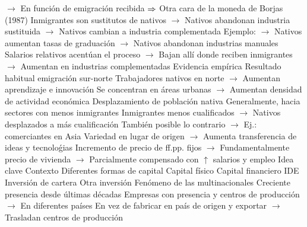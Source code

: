 \documentclass{nuevotema}
\begin{document}
\begin{esquemal}
				\4[] $\to$ En función de emigración recibida
				\4[] $\Rightarrow$ Otra cara de la moneda de Borjas (1987)
				\4[] Inmigrantes son sustitutos de nativos
				\4[] $\to$ Nativos abandonan industria sustituida
				\4[] $\to$ Nativos cambian a industria complementada
				\4[] Ejemplo:
				\4[] $\to$ Nativos aumentan tasas de graduación
				\4[] $\to$ Nativos abandonan industrias manuales
				\4[] Salarios relativos acentúan el proceso
				\4[] $\to$ Bajan allí donde reciben inmigrantes
				\4[] $\to$ Aumentan en industrias complementadas
				\4 Evidencia empírica
				\4[] Resultado habitual emigración sur-norte
				\4[] Trabajadores nativos en norte
				\4[] $\to$ Aumentan aprendizaje e innovación
				\4[] Se concentran en áreas urbanas
				\4[] $\to$ Aumentan densidad de actividad económica
				\4 Desplazamiento de población nativa
				\4[] Generalmente, hacia sectores con menos inmigrantes
				\4[] Inmigrantes menos cualificados
				\4[] $\to$ Nativos desplazados a más cualificación
				\4[] También posible lo contrario
				\4[] $\to$ Ej.: comerciantes en Asia
			\3 Variedad en lugar de origen
				\4 $\to$ Aumenta transferencia de ideas y tecnoloǵias
				\4[] Incremento de precio de ff.pp. fijos
				\4[] $\to$ Fundamentalmente precio de vivienda
				\4[] $\to$ Parcialmente compensado con $\uparrow$ salarios y empleo
	\1 
		\2 Idea clave
			\3 Contexto
				\4 Diferentes formas de capital
				\4[] Capital físico
				\4[] Capital financiero
				\4[] IDE
				\4[] Inversión de cartera
				\4[] Otra inversión
				\4 Fenómeno de las multinacionales
				\4[] Creciente presencia desde últimas décadas
				\4[] Empresas con presencia y centros de producción
				\4[] $\to$ En diferentes países
				\4[] En vez de fabricar en país de origen y exportar
				\4[] $\to$ Trasladan centros de producción


\end{esquemal}
\end{document}
